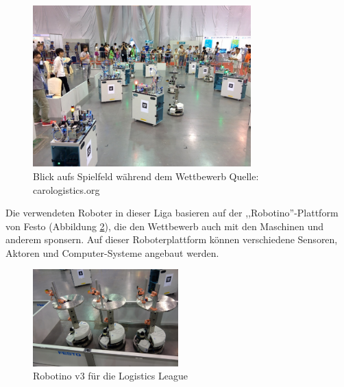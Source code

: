 \begin{figure}[H]
	\centering
	\includegraphics[width=0.75\textwidth]{img/robocup-in-action.jpg}
	\caption{Blick aufs Spielfeld während dem Wettbewerb Quelle: carologistics.org \cite{carologistics-blog}}
	\label{fig:robocup_spielfeld-real}
\end{figure}

Die verwendeten Roboter in dieser Liga basieren auf der ,,Robotino''-Plattform  von Festo (Abbildung \ref{fig:robotino}), die den Wettbewerb auch mit den Maschinen und anderem sponsern. Auf dieser Roboterplattform können verschiedene Sensoren, Aktoren und Computer-Systeme angebaut werden.
\begin{figure}[H]
	\centering
	\includegraphics[width=0.5\textwidth]{img/robotino_v3.jpg}
	\caption{Robotino v3 für die Logistics League\cite{robotino}}
	\label{fig:robotino}
\end{figure}



